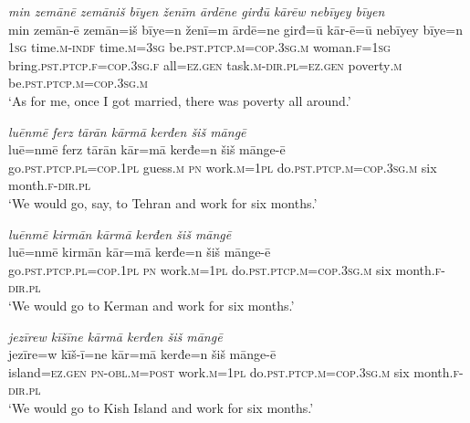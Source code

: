 \ea \label{ŽM.20}
\textit{min zemānē zemāniš bīyen ženīm ārdēne girđū kārēw nebīyey bīyen} \\ 
\gll min zemān-ē zemān=iš bīye=n ženī=m ārdē=ne girđ=ū kār-ē=ū nebīyey bīye=n \\ 
 \textsc{1sg} time\textsc{.m}\textsc{-indf} time\textsc{.m}\textsc{=3sg} be\textsc{.pst}\textsc{.ptcp}\textsc{.m}\textsc{=cop}\textsc{.3sg}\textsc{.m} woman\textsc{.f}\textsc{=\textsc{1sg}} bring\textsc{.pst}\textsc{.ptcp}\textsc{.f}\textsc{=cop}\textsc{.3sg}\textsc{.f} all\textsc{=ez.gen} task\textsc{.m}\textsc{-dir}\textsc{.pl}\textsc{=ez.gen} poverty\textsc{.m} be\textsc{.pst}\textsc{.ptcp}\textsc{.m}\textsc{=cop}\textsc{.3sg}\textsc{.m} \\ 
\glt `As for me, once I got married, there was poverty all around.'
\z 
 
\ea \label{ŽM.23}
\textit{luēnmē ferz tārān kārmā kerđen šiš māngē} \\ 
\gll luē=nmē ferz tārān kār=mā kerđe=n šiš mānge-ē \\ 
 go\textsc{.pst}\textsc{.ptcp}\textsc{.pl}\textsc{=cop}\textsc{.\textsc{1pl}} guess\textsc{.m} \textsc{pn} work\textsc{.m}\textsc{=\textsc{1pl}} do\textsc{.pst}\textsc{.ptcp}\textsc{.m}\textsc{=cop}\textsc{.3sg}\textsc{.m} six month\textsc{.f}\textsc{-dir}\textsc{.pl} \\ 
\glt `We would go, say, to Tehran and work for six months.'
\z 
 
\ea \label{ŽM.24}
\textit{luēnmē kirmān kārmā kerđen šiš māngē} \\ 
\gll luē=nmē kirmān kār=mā kerđe=n šiš mānge-ē \\ 
 go\textsc{.pst}\textsc{.ptcp}\textsc{.pl}\textsc{=cop}\textsc{.\textsc{1pl}} \textsc{pn} work\textsc{.m}\textsc{=\textsc{1pl}} do\textsc{.pst}\textsc{.ptcp}\textsc{.m}\textsc{=cop}\textsc{.3sg}\textsc{.m} six month\textsc{.f}\textsc{-dir}\textsc{.pl} \\ 
\glt `We would go to Kerman and work for six months.'
\z 
 
\ea \label{ŽM.25}
\textit{jezīrew kīšīne kārmā kerđen šiš māngē} \\ 
\gll jezīre=w kīš-ī=ne kār=mā kerđe=n šiš mānge-ē \\ 
 island\textsc{=ez.gen} \textsc{pn}\textsc{-obl}\textsc{.m}\textsc{=\textsc{post}} work\textsc{.m}\textsc{=\textsc{1pl}} do\textsc{.pst}\textsc{.ptcp}\textsc{.m}\textsc{=cop}\textsc{.3sg}\textsc{.m} six month\textsc{.f}\textsc{-dir}\textsc{.pl} \\ 
\glt `We would go to Kish Island and work for six months.'
\z 
 
